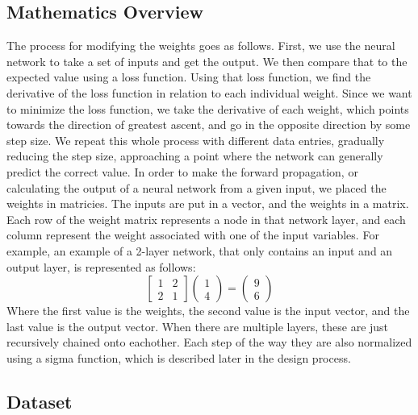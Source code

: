 \documentclass[10pt]{article}
\begin{document}
\subsection{Mathematics Overview}
The process for modifying the weights goes as follows. First, we use the neural network to take a set of inputs and get the output. We then compare that to the expected value using a loss function. Using that loss function, we find the derivative of the loss function in relation to each individual weight. Since we want to minimize the loss function, we take the derivative of each weight, which points towards the direction of greatest ascent, and go in the opposite direction by some step size. We repeat this whole process with different data entries, gradually reducing the step size, approaching a point where the network can generally predict the correct value.\newline
In order to make the forward propagation, or calculating the output of a neural network from a given input, we placed the weights in matricies. The inputs are put in a vector, and the weights in a matrix. Each row of the weight matrix represents a node in that network layer, and each column represent the weight associated with one of the input variables.
For example, an example of a 2-layer network, that only contains an input and an output layer, is represented as follows:
$$\begin{bmatrix} 1 & 2 \\ 2 & 1\end{bmatrix}\begin{pmatrix}1\\4\end{pmatrix} = \begin{pmatrix}9 \\ 6\end{pmatrix}$$
Where the first value is the weights, the second value is the input vector, and the last value is the output vector. When there are multiple layers, these are just recursively chained onto eachother. Each step of the way they are also normalized using a sigma function, which is described later in the design process.

\subsection{Dataset}
\end{document}
